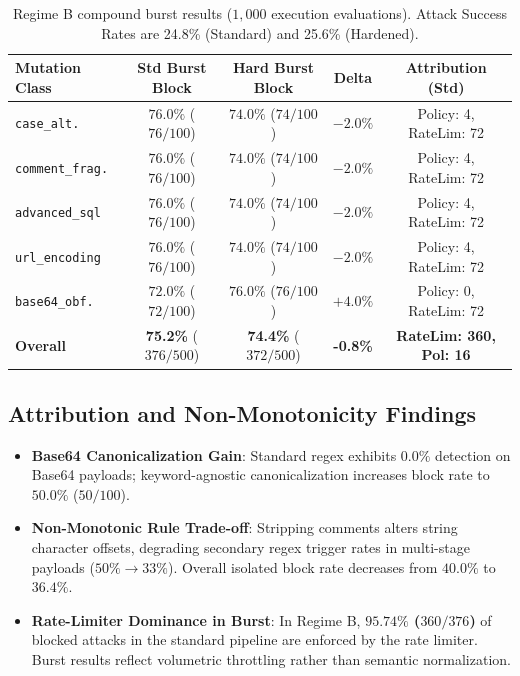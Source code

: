 \documentclass[10pt,twocolumn,letterpaper]{article}
\begin{document}
\begin{table}[h]
\centering
\scriptsize
\caption{Regime B compound burst results ($1{,}000$ execution evaluations). Attack Success Rates are 24.8\% (Standard) and 25.6\% (Hardened).}
\label{tab:regime_b}
\begin{tabular}{lcccc}
\toprule
\textbf{Mutation Class} & \textbf{Std Burst Block} & \textbf{Hard Burst Block} & \textbf{Delta} & \textbf{Attribution (Std)} \\
\midrule
\texttt{case\_alt.} & $76.0\%$ ($76/100$) & $74.0\%$ ($74/100$) & $-2.0\%$ & Policy: 4, RateLim: 72 \\
\texttt{comment\_frag.} & $76.0\%$ ($76/100$) & $74.0\%$ ($74/100$) & $-2.0\%$ & Policy: 4, RateLim: 72 \\
\texttt{advanced\_sql} & $76.0\%$ ($76/100$) & $74.0\%$ ($74/100$) & $-2.0\%$ & Policy: 4, RateLim: 72 \\
\texttt{url\_encoding} & $76.0\%$ ($76/100$) & $74.0\%$ ($74/100$) & $-2.0\%$ & Policy: 4, RateLim: 72 \\
\texttt{base64\_obf.} & $72.0\%$ ($72/100$) & $76.0\%$ ($76/100$) & $+4.0\%$ & Policy: 0, RateLim: 72 \\
\midrule
\textbf{Overall} & \textbf{75.2\%} ($376/500$) & \textbf{74.4\%} ($372/500$) & \textbf{-0.8\%} & \textbf{RateLim: 360, Pol: 16} \\
\bottomrule
\end{tabular}
\end{table}

\subsection{Attribution and Non-Monotonicity Findings}
\begin{itemize}
    \item \textbf{Base64 Canonicalization Gain}: Standard regex exhibits $0.0\%$ detection on Base64 payloads; keyword-agnostic canonicalization increases block rate to $50.0\%$ ($50/100$).
    \item \textbf{Non-Monotonic Rule Trade-off}: Stripping comments alters string character offsets, degrading secondary regex trigger rates in multi-stage payloads ($50\% \to 33\%$). Overall isolated block rate decreases from $40.0\%$ to $36.4\%$.
    \item \textbf{Rate-Limiter Dominance in Burst}: In Regime B, \textbf{$95.74\%$ ($360/376$)} of blocked attacks in the standard pipeline are enforced by the rate limiter. Burst results reflect volumetric throttling rather than semantic normalization.
\end{itemize}
\end{document}
